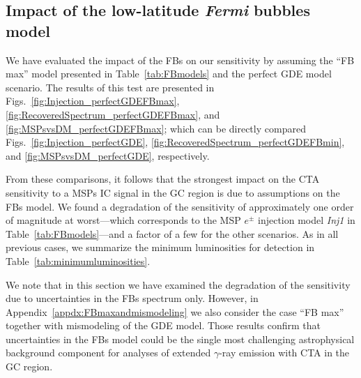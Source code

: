 \documentclass[doublespace,draft,nopageskip]{VTthesis} %
\begin{document}
\subsection{Impact of the low-latitude \textit{Fermi} bubbles model}
\label{subsec:FBsImpact}

 We have evaluated the impact of the FBs on our sensitivity by assuming the ``FB max'' model presented in Table~\ref{tab:FBmodels} and the perfect GDE model scenario. The results of this test are presented in Figs.~\ref{fig:Injection_perfectGDEFBmax}, \ref{fig:RecoveredSpectrum_perfectGDEFBmax}, and \ref{fig:MSPsvsDM_perfectGDEFBmax}; which can be directly compared Figs.~\ref{fig:Injection_perfectGDE}, \ref{fig:RecoveredSpectrum_perfectGDEFBmin}, and \ref{fig:MSPsvsDM_perfectGDE}, respectively. 

From these comparisons, it follows that the strongest impact on the CTA sensitivity to a MSPs IC signal in the GC region is due to assumptions on the FBs model. We found a degradation of the sensitivity of approximately one order of magnitude at worst---which corresponds to the MSP $e^\pm$ injection model \textit{Inj1} in Table~\ref{tab:FBmodels}---and a factor of a few for the other scenarios. As in all previous cases, we summarize the minimum luminosities for detection in Table~\ref{tab:minimumluminosities}.  

We note that in this section we have examined the degradation of the sensitivity due to uncertainties in the FBs spectrum only. However, in Appendix~\ref{appdx:FBmaxandmismodeling} we also consider the case ``FB max'' together with  mismodeling of the GDE model. Those results confirm that uncertainties in the FBs model could be the single most challenging astrophysical background component for analyses of extended $\gamma$-ray emission with CTA in the GC region.     
\end{document}
